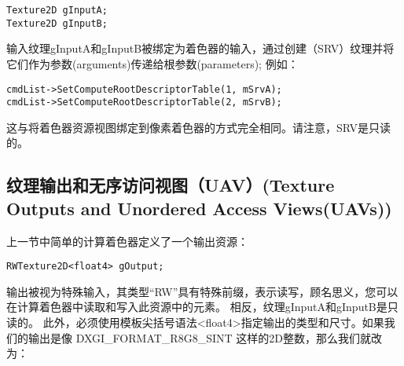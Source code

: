 
\begin{lstlisting}
Texture2D gInputA;
Texture2D gInputB;
\end{lstlisting}

\begin{flushleft}
输入纹理gInputA和gInputB被绑定为着色器的输入，通过创建（SRV）纹理并将它们作为参数(arguments)传递给根参数(parameters); 例如：\\
\end{flushleft}

\begin{lstlisting}
cmdList->SetComputeRootDescriptorTable(1, mSrvA);
cmdList->SetComputeRootDescriptorTable(2, mSrvB);
\end{lstlisting}

\begin{flushleft}
这与将着色器资源视图绑定到像素着色器的方式完全相同。请注意，SRV是只读的。
\end{flushleft}

\subsection{纹理输出和无序访问视图（UAV）(Texture Outputs and Unordered Access Views(UAVs))}
\begin{flushleft}
上一节中简单的计算着色器定义了一个输出资源：\\
\end{flushleft}

\begin{lstlisting}
RWTexture2D<float4> gOutput;
\end{lstlisting}

\begin{flushleft}
输出被视为特殊输入，其类型“RW”具有特殊前缀，表示读写，顾名思义，您可以在计算着色器中读取和写入此资源中的元素。 相反，纹理gInputA和gInputB是只读的。 此外，必须使用模板尖括号语法<float4>指定输出的类型和尺寸。如果我们的输出是像 DXGI\_FORMAT\_R8G8\_SINT 这样的2D整数，那么我们就改为：
\end{flushleft}















